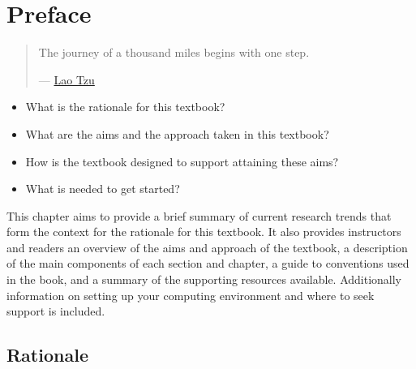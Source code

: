 \documentclass[
  letterpaper,
]{latex/krantz}
\providecommand{\tightlist}{%
  \setlength{\itemsep}{0pt}\setlength{\parskip}{0pt}}\usepackage{longtable,booktabs,array}
\begin{document}
\hypertarget{sec-preface}{%
\chapter*{Preface}\label{sec-preface}}

\begin{quote}
The journey of a thousand miles begins with one step.

--- \href{https://en.wikipedia.org/wiki/Laozi}{Lao Tzu}
\end{quote}

\begin{tcolorbox}[enhanced jigsaw, opacitybacktitle=0.6, breakable, colframe=quarto-callout-note-color-frame, arc=.35mm, left=2mm, leftrule=.75mm, title=\textcolor{quarto-callout-note-color}{\faInfo}\hspace{0.5em}{Keys}, opacityback=0, colback=white, toptitle=1mm, rightrule=.15mm, titlerule=0mm, bottomtitle=1mm, bottomrule=.15mm, coltitle=black, colbacktitle=quarto-callout-note-color!10!white, toprule=.15mm]

\begin{itemize}
\tightlist
\item
  What is the rationale for this textbook?
\item
  What are the aims and the approach taken in this textbook?
\item
  How is the textbook designed to support attaining these aims?
\item
  What is needed to get started?
\end{itemize}

\end{tcolorbox}

This chapter aims to provide a brief summary of current research trends
that form the context for the rationale for this textbook. It also
provides instructors and readers an overview of the aims and approach of
the textbook, a description of the main components of each section and
chapter, a guide to conventions used in the book, and a summary of the
supporting resources available. Additionally information on setting up
your computing environment and where to seek support is included.

\hypertarget{rationale}{%
\section*{Rationale}\label{rationale}}
\end{document}
